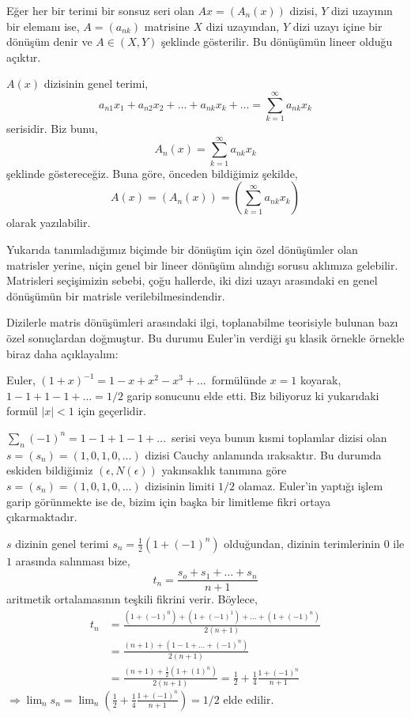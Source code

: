 Eğer her bir terimi bir sonsuz seri olan $Ax=(A_n(x))$ dizisi, $Y$ dizi uzayının bir elemanı ise, $A=(a_{nk})$ matrisine $X$ dizi uzayından, $Y$ dizi uzayı içine bir dönüşüm denir ve $A\in (X,Y)$ şeklinde gösterilir. Bu dönüşümün lineer olduğu açıktır.

$A(x)$ dizisinin genel terimi,
$$
a_{n1}x_1+a_{n2}x_2+\ldots+a_{nk}x_k+\ldots=\sum\limits_{k=1}^\infty a_{nk}x_k
$$
serisidir. Biz bunu,
$$
A_n(x)=\sum\limits_{k=1}^\infty a_{nk}x_k
$$
şeklinde göstereceğiz. Buna göre, önceden bildiğimiz şekilde,
$$
A(x)=\left(A_n(x)\right)=\left(\sum\limits_{k=1}^\infty a_{nk}x_k\right)
$$
olarak yazılabilir.

Yukarıda tanımladığımız biçimde bir dönüşüm için özel dönüşümler olan matrisler yerine, niçin genel bir lineer dönüşüm alındığı sorusu aklımıza gelebilir. Matrisleri seçişimizin sebebi, çoğu hallerde, iki dizi uzayı arasındaki en genel dönüşümün bir matrisle verilebilmesindendir.

Dizilerle matris dönüşümleri arasındaki ilgi, toplanabilme teorisiyle bulunan bazı özel sonuçlardan doğmuştur. Bu durumu Euler'in verdiği şu klasik örnekle örnekle biraz daha açıklayalım:

Euler, $(1+x)^{-1}=1-x+x^2-x^3+\ldots\,$ formülünde $x=1$ koyarak,\\ $1-1+1-1+\ldots=1/2$ garip sonucunu elde etti. Biz biliyoruz ki yukarıdaki formül $|x|<1$ için geçerlidir.

$\sum\limits_n(-1)^n=1-1+1-1+\ldots\,$ serisi veya bunun kısmi toplamlar dizisi olan $s=(s_n)=(1,0,1,0,\ldots)$ dizisi Cauchy anlamında ıraksaktır. Bu durumda eskiden bildiğimiz $(\epsilon,N(\epsilon))$ yakınsaklık tanımına göre $s=(s_n)=(1,0,1,0,\ldots)$ dizisinin limiti $1/2$ olamaz. Euler'in yaptığı işlem garip görünmekte ise de, bizim için başka bir limitleme fikri ortaya çıkarmaktadır. 

$s$ dizinin genel terimi $s_n=\frac{1}{2}(1+(-1)^n)$ olduğundan, dizinin terimlerinin $0$ ile $1$ arasında salınması bize,
$$
t_n=\frac{s_o+s_1+\ldots+s_n}{n+1}
$$
aritmetik ortalamasının teşkili fikrini verir. Böylece,
$$
\begin{aligned}
t_n&=\frac{(1+(-1)^0)+(1+(-1)^1)+\ldots+(1+(-1)^n)}{2(n+1)}\\
&=\frac{(n+1)+(1-1+\ldots+(-1)^n)}{2(n+1)}\\
&=\frac{(n+1)+\frac{1}{2}(1+(1)^n)}{2(n+1)}=\frac{1}{2}+\frac{1}{4}\frac{1+(-1)^n}{n+1}
\end{aligned}
$$
$\Rightarrow\lim_ns_n=\lim_n\left(\frac{1}{2}+\frac{1}{4}\frac{1+(-1)^n}{n+1}\right)=1/2$ elde edilir.

